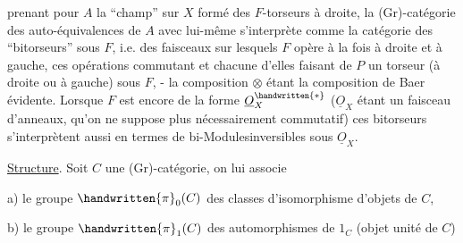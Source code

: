 
prenant pour $A$ la ``champ'' sur $X$ formé des $F$-torseurs à droite, la (Gr)-catégorie des auto-équivalences de $A$ avec lui-même s'interprète comme la catégorie des ``bitorseurs'' sous $F$, i.e. des faisceaux  sur lesquels $F$ opère à la fois à droite et à gauche, ces opérations commutant et chacune d'elles faisant de $P$ un torseur (à droite ou à gauche) sous $F$, - la composition $\otimes$ étant la composition de Baer évidente. Lorsque $F$ est encore de la forme $\underline O_X^{\handwritten{*}}$ ($\underline O_X$ étant un faisceau d'anneaux, qu'on ne suppose plus nécessairement commutatif) ces bitorseurs s'interprètent aussi en termes de bi-Modulesinversibles sous $\underline O_X$.

\uline{Structure}. Soit $C$ une (Gr)-catégorie, on lui associe

a) le groupe $\handwritten{\pi}_0(C)$ des classes d'isomorphisme d'objets de $C$,

b) le groupe $\handwritten{\pi}_1(C)$ des automorphismes de $1_C$ (objet unité de $C$)

